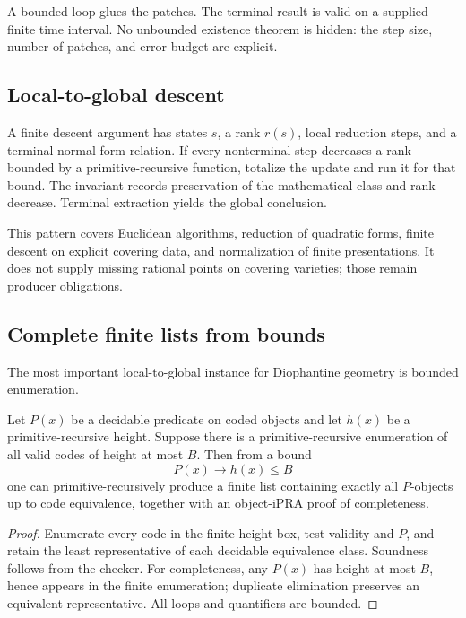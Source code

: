 A bounded loop glues the patches.  The terminal result is valid on a supplied finite time interval.  No unbounded existence theorem is hidden: the step size, number of patches, and error budget are explicit.

\subsection{Local-to-global descent}

A finite descent argument has states \(s\), a rank \(r(s)\), local reduction steps, and a terminal normal-form relation.  If every nonterminal step decreases a rank bounded by a primitive-recursive function, totalize the update and run it for that bound.  The invariant records preservation of the mathematical class and rank decrease.  Terminal extraction yields the global conclusion.

This pattern covers Euclidean algorithms, reduction of quadratic forms, finite descent on explicit covering data, and normalization of finite presentations.  It does not supply missing rational points on covering varieties; those remain producer obligations.

\subsection{Complete finite lists from bounds}

The most important local-to-global instance for Diophantine geometry is bounded enumeration.

\begin{theorem}
\label{thm:height-to-list}
Let \(P(x)\) be a decidable predicate on coded objects and let \(h(x)\) be a primitive-recursive height.  Suppose there is a primitive-recursive enumeration of all valid codes of height at most \(B\).  Then from a bound
\[
 P(x)\to h(x)\le B
\]
one can primitive-recursively produce a finite list containing exactly all \(P\)-objects up to code equivalence, together with an object-iPRA proof of completeness.
\end{theorem}

\begin{proof}
Enumerate every code in the finite height box, test validity and \(P\), and retain the least representative of each decidable equivalence class.  Soundness follows from the checker.  For completeness, any \(P(x)\) has height at most \(B\), hence appears in the finite enumeration; duplicate elimination preserves an equivalent representative.  All loops and quantifiers are bounded.
\end{proof}

